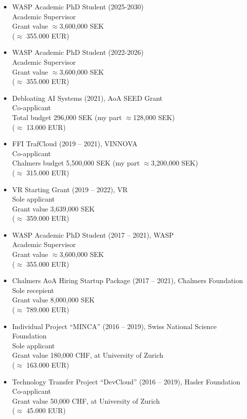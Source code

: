 \documentclass[paper=letter,fontsize=11pt]{scrartcl} %
\begin{document}
\begin{itemize}
  \item WASP Academic PhD Student (2025-2030)\\
  Academic Supervisor\\
  Grant value $\approx$3,600,000 SEK\\
  ($\approx$ 355.000 EUR)  
  \item WASP Academic PhD Student (2022-2026)\\
  Academic Supervisor\\
  Grant value $\approx$3,600,000 SEK\\
  ($\approx$ 355.000 EUR)
  \item Debloating AI Systems (2021), AoA SEED Grant\\
  Co-applicant\\
  Total budget 296,000 SEK (my part $\approx$128,000 SEK)\\
  ($\approx$ 13.000 EUR)
	\item FFI TrafCloud (2019 -- 2021), VINNOVA\\
	Co-applicant\\
	Chalmers budget 5,500,000 SEK (my part $\approx$3,200,000 SEK)\\
  ($\approx$ 315.000 EUR)
  \item VR Starting Grant (2019 -- 2022), VR\\
  Sole applicant\\
	Grant value 3,639,000 SEK\\
  ($\approx$ 359.000 EUR)
  \item WASP Academic PhD Student (2017 -- 2021), WASP\\
  Academic Supervisor\\
	Grant value $\approx$3,600,000 SEK\\
  ($\approx$ 355.000 EUR)
  \item Chalmers AoA Hiring Startup Package (2017 -- 2021), Chalmers Foundation\\
	Sole recepient\\
  Grant value 8,000,000 SEK\\
  ($\approx$ 789.000 EUR)
  \item Individual Project ``MINCA'' (2016 -- 2019), Swiss National Science Foundation\\
  Sole applicant \\
  Grant value 180,000 CHF, at University of Zurich\\
  ($\approx$ 163.000 EUR)
  \item Technology Transfer Project ``DevCloud'' (2016 -- 2019), Hasler Foundation\\
  Co-applicant \\
  Grant value 50,000 CHF, at University of Zurich\\
  ($\approx$ 45.000 EUR)
\end{itemize}
\end{document}
